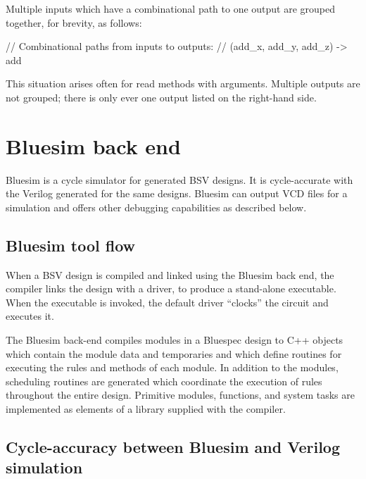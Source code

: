 \documentclass{article}
\newenvironment{centerboxverbatim}
  {\center
   \boxedverbatim}
  {\endboxedverbatim
  {\endcenter }}
\begin{document}
Multiple inputs which have a combinational path to one output are
grouped together, for brevity, as follows:

\begin{centerboxverbatim}
// Combinational paths from inputs to outputs:
//   (add_x,  add_y,  add_z) -> add
\end{centerboxverbatim}

This situation arises often for read methods with arguments.  Multiple
outputs are not grouped; there is only ever one output listed on the
right-hand side.



\section{Bluesim back end}
\label{bluesim-back-end}

Bluesim is a cycle simulator for generated BSV designs.  It is
cycle-accurate with the Verilog generated for the same designs.
Bluesim can output VCD files for a simulation and offers other
debugging capabilities as described below.


\subsection{Bluesim tool flow}

When a BSV design is compiled and linked using the Bluesim back end,
the compiler links the design with a driver, to produce a stand-alone
executable.  When the executable is invoked, the default driver
{}``clocks'' the circuit and executes it.

The Bluesim back-end compiles modules in a Bluespec design to
C++ objects which contain the module data and temporaries and which
define routines for executing the rules and methods of each module.
In addition to the modules, scheduling routines are generated
which coordinate the execution of rules throughout the entire design.
Primitive modules, functions, and system tasks are implemented as
elements of a library supplied with the compiler.


\subsection{Cycle-accuracy between Bluesim and Verilog simulation}
\end{document}
